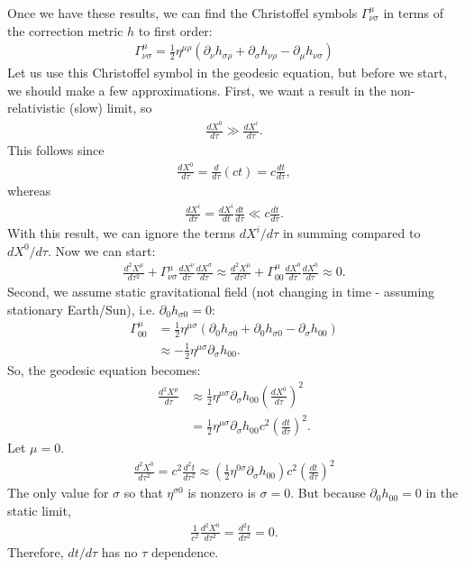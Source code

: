 \documentclass{book}
\theoremstyle{definition}
\begin{document}
Once we have these results, we can find the Christoffel symbols $\Gamma^{\mu}_{\nu\sigma}$ in terms of the correction metric $h$ to first order:
\begin{align*}
\boxed{\Gamma^{\mu}_{\nu\sigma} = \frac{1}{2}\eta^{\mu\rho}\left(\partial_\nu h_{\sigma\rho} + \partial_\sigma h_{\nu\rho} - \partial_\mu h_{\nu\sigma} \right) }
\end{align*}
Let us use this Christoffel symbol in the geodesic equation, but before we start, we should make a few approximations. First, we want a result in the non-relativistic (slow) limit, so
\begin{align*}
\frac{dX^0}{d\tau} \gg \frac{dX^i}{d\tau}.
\end{align*}
This follows since
\begin{align*}
\frac{dX^0}{d\tau} = \frac{d}{d\tau}(ct) = c\frac{dt}{d\tau},
\end{align*}
whereas
\begin{align*}
\frac{dX^i}{d\tau} = \frac{dX^i}{dt}\frac{dt}{d\tau} \ll c\frac{dt}{d\tau}.
\end{align*}
With this result, we can ignore the terms $dX^i/d\tau$ in summing compared to $dX^0/d\tau$. Now we can start:
\begin{align*}
\frac{d^2X^\mu}{d\tau^2} + \Gamma^{\mu}_{\nu\sigma}\frac{dX^\nu}{d\tau}\frac{dX^\sigma}{d\tau} \approx \frac{d^2X^\mu}{d\tau^2} + \Gamma^{\mu}_{00}\frac{dX^0}{d\tau}\frac{dX^0}{d\tau} \approx 0.
\end{align*}
Second, we assume static gravitational field (not changing in time - assuming stationary Earth/Sun), i.e. $\partial_0 h_{\sigma 0 } = 0$:
\begin{align*}
\Gamma^{\mu}_{00} &= \frac{1}{2}\eta^{\mu\sigma}\left( \partial_0h_{\sigma 0} + \partial_0 h_{\sigma 0} - \partial_\sigma h_{00}\right) \\
&\approx -\frac{1}{2}\eta^{\mu\sigma}\partial_{\sigma}h_{00}.
\end{align*} 
So, the geodesic equation becomes:
\begin{align*}
\frac{d^2X^\mu}{d\tau} &\approx  \frac{1}{2}\eta^{\mu\sigma}\partial_{\sigma}h_{00}\left( \frac{dX^0}{d\tau} \right)^2\\
&= \frac{1}{2}\eta^{\mu\sigma}\partial_{\sigma}h_{00}c^2\left( \frac{dt}{d\tau} \right)^2.
\end{align*}
Let $\mu = 0$. 
\begin{align*}
\frac{d^2X^0}{d\tau^2} = c^2\frac{d^2t}{d\tau^2} \approx \left(\frac{1}{2}\eta^{0\sigma}\partial_\sigma h_{00} \right)c^2\left(\frac{dt}{d\tau} \right) ^2 
\end{align*}
The only value for $\sigma$ so that $\eta^{\sigma 0}$ is nonzero is $\sigma = 0$. But because $\partial_0 h_{00} = 0$ in the static limit,
\begin{align*}
\frac{1}{c^2}\frac{d^2X^0}{d\tau^2} = \frac{d^2t}{d\tau^2} = 0.
\end{align*}
Therefore, $dt/d\tau$ has no $\tau$ dependence.\\
\end{document}
